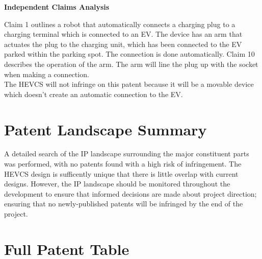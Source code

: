 \documentclass [12pt]{article}
\begin{document}
\textbf{Independent Claims Analysis}

Claim 1 outlines a robot that automatically connects a charging plug to a charging terminal which is connected to an EV. The device has an arm that actuates the plug to the charging unit, which has been connected to the EV parked within the parking spot. The connection is done automatically.
Claim 10 describes the operation of the arm. The arm will line the plug up with the socket when making a connection.
\\
The HEVCS will not infringe on this patent because it will be a movable device which doesn’t create an automatic connection to the EV.

\section{Patent Landscape Summary}
A detailed search of the IP landscape surrounding the major constituent parts was performed, with no patents found with a high risk of infringement. The HEVCS design is sufficently unique that there is little overlap with current designs. However, the IP landscape should be monitored throughout the development to ensure that informed decisions are made about project direction; ensuring that no newly-published patents will be infringed by the end of the project.
 \newpage
 
 

\newpage
\appendix
\section{Full Patent Table}\label{app:full_patent_table}
\end{document}
